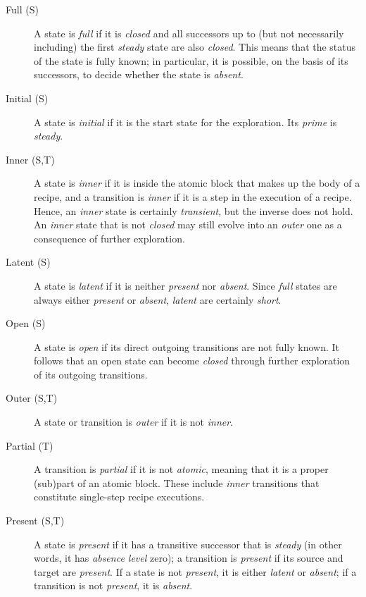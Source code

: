 \documentclass{article}
\begin{document}
\begin{description}
\item[Full (S)] A state is \emph{full} if it is \emph{closed} and all successors up to (but not necessarily including) the first \emph{steady} state are also \emph{closed}. This means that the status of the state is fully known; in particular, it is possible, on the basis of its successors, to decide whether the state is \emph{absent}.

\item[Initial (S)] A state is \emph{initial} if it is the start state for the exploration. Its \emph{prime} is \emph{steady}.

\item[Inner (S,T)] A state is \emph{inner} if it is inside the atomic block that makes up the body of a recipe, and a transition is \emph{inner} if it is a step in the execution of a recipe. Hence, an \emph{inner} state is certainly \emph{transient}, but the inverse does not hold. An \emph{inner} state that is not \emph{closed} may still evolve into an \emph{outer} one as a consequence of further exploration.

\item[Latent (S)] A state is \emph{latent} if it is neither \emph{present} nor \emph{absent}. Since \emph{full} states are always either \emph{present} or \emph{absent}, \emph{latent} are certainly \emph{short}.

\item[Open (S)] A state is \emph{open} if its direct outgoing transitions are not fully known. It follows that an open state can become \emph{closed} through further exploration of its outgoing transitions.

\item[Outer (S,T)] A state or transition is \emph{outer} if it is not \emph{inner}.

\item[Partial (T)] A transition is \emph{partial} if it is not \emph{atomic}, meaning that it is a proper (sub)part of an atomic block. These include \emph{inner} transitions that constitute single-step recipe executions.

\item[Present (S,T)] A state is \emph{present} if it has a transitive successor that is \emph{steady} (in other words, it has \emph{absence level} zero); a transition is \emph{present} if its source and target are \emph{present}. If a state is not \emph{present}, it is either \emph{latent} or \emph{absent}; if a transition is not \emph{present}, it is \emph{absent}.


\end{description}
\end{document}
